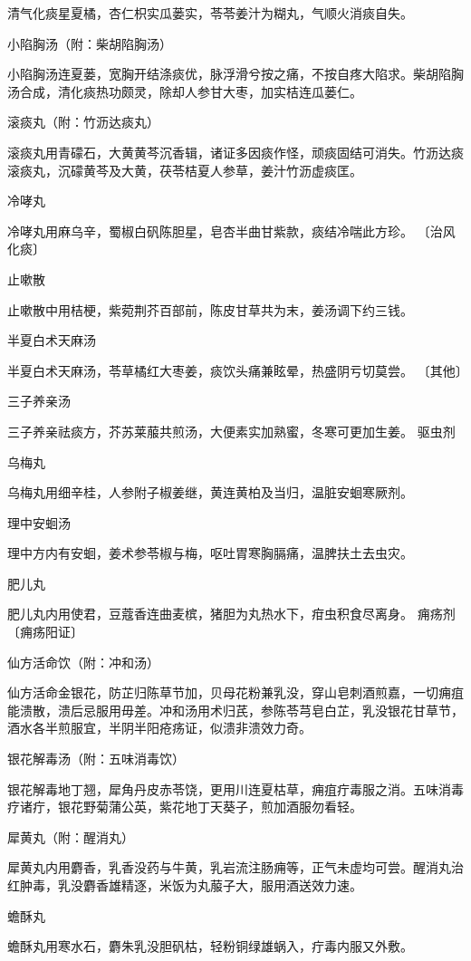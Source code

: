 \documentclass[a4paper,12pt,UTF8,twoside]{ctexbook}
\begin{document}
清气化痰星夏橘，杏仁枳实瓜蒌实，苓苓姜汁为糊丸，气顺火消痰自失。

小陷胸汤（附：柴胡陷胸汤）

小陷胸汤连夏蒌，宽胸开结涤痰优，脉浮滑兮按之痛，不按自疼大陷求。柴胡陷胸汤合成，清化痰热功颇灵，除却人参甘大枣，加实桔连瓜蒌仁。

滚痰丸（附：竹沥达痰丸）

滚痰丸用青礞石，大黄黄芩沉香辑，诸证多因痰作怪，顽痰固结可消失。竹沥达痰滚痰丸，沉礞黄芩及大黄，茯苓桔夏人参草，姜汁竹沥虚痰匡。

冷哮丸

冷哮丸用麻乌辛，蜀椒白矾陈胆星，皂杏半曲甘紫款，痰结冷喘此方珍。
〔治风化痰〕

止嗽散

止嗽散中用桔梗，紫菀荆芥百部前，陈皮甘草共为末，姜汤调下约三钱。

半夏白术天麻汤

半夏白术天麻汤，苓草橘红大枣姜，痰饮头痛兼眩晕，热盛阴亏切莫尝。
〔其他〕

三子养亲汤

三子养亲祛痰方，芥苏莱菔共煎汤，大便素实加熟蜜，冬寒可更加生姜。
驱虫剂

乌梅丸

乌梅丸用细辛桂，人参附子椒姜继，黄连黄柏及当归，温脏安蛔寒厥剂。

理中安蛔汤

理中方内有安蛔，姜术参苓椒与梅，呕吐胃寒胸膈痛，温脾扶土去虫灾。

肥儿丸

肥儿丸内用使君，豆蔻香连曲麦槟，猪胆为丸热水下，疳虫积食尽离身。
痈疡剂
〔痈疡阳证〕

仙方活命饮（附：冲和汤）

仙方活命金银花，防芷归陈草节加，贝母花粉兼乳没，穿山皂刺酒煎嘉，一切痈疽能溃散，溃后忌服用毋差。冲和汤用术归芪，参陈苓芎皂白芷，乳没银花甘草节，酒水各半煎服宜，半阴半阳疮疡证，似溃非溃效力奇。

银花解毒汤（附：五味消毒饮）

银花解毒地丁翘，犀角丹皮赤苓饶，更用川连夏枯草，痈疽疔毒服之消。五味消毒疗诸疔，银花野菊蒲公英，紫花地丁天葵子，煎加酒服勿看轻。

犀黄丸（附：醒消丸）

犀黄丸内用麝香，乳香没药与牛黄，乳岩流注肠痈等，正气未虚均可尝。醒消丸治红肿毒，乳没麝香雄精逐，米饭为丸菔子大，服用酒送效力速。

蟾酥丸

蟾酥丸用寒水石，麝朱乳没胆矾枯，轻粉铜绿雄蜗入，疔毒内服又外敷。
\end{document}
